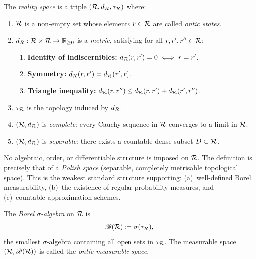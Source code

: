 \begin{definition}
\label{def:3.1}
The \emph{reality space} is a triple $(\mathcal{R}, d_{\mathcal{R}}, \tau_{\mathcal{R}})$ where:
\begin{enumerate}
  \item[(i)] $\mathcal{R}$ is a non-empty set whose elements $r \in \mathcal{R}$ are
    called \emph{ontic states}.
  \item[(ii)] $d_{\mathcal{R}} : \mathcal{R} \times \mathcal{R} \to \mathbb{R}_{\geq 0}$ is a
    \emph{metric}, satisfying for all $r, r', r'' \in \mathcal{R}$:
    \begin{enumerate}
      \item[(M1)] \textbf{Identity of indiscernibles:}
        $d_{\mathcal{R}}(r, r') = 0 \iff r = r'$.
      \item[(M2)] \textbf{Symmetry:} $d_{\mathcal{R}}(r, r') = d_{\mathcal{R}}(r', r)$.
      \item[(M3)] \textbf{Triangle inequality:}
        $d_{\mathcal{R}}(r, r'') \leq d_{\mathcal{R}}(r, r') + d_{\mathcal{R}}(r', r'')$.
    \end{enumerate}
  \item[(iii)] $\tau_{\mathcal{R}}$ is the topology induced by $d_{\mathcal{R}}$.
  \item[(iv)] $(\mathcal{R}, d_{\mathcal{R}})$ is \emph{complete}: every Cauchy sequence
    in $\mathcal{R}$ converges to a limit in $\mathcal{R}$.
  \item[(v)] $(\mathcal{R}, d_{\mathcal{R}})$ is \emph{separable}: there exists a
    countable dense subset $D \subset \mathcal{R}$.
\end{enumerate}
\end{definition}

\begin{remark}
\label{rem:3.1}
No algebraic, order, or differentiable structure is imposed on $\mathcal{R}$.
The definition is precisely that of a \emph{Polish space} (separable,
completely metrisable topological space).  This is the weakest standard
structure supporting:
(a)~well-defined Borel measurability,
(b)~the existence of regular probability measures, and
(c)~countable approximation schemes.
\end{remark}

\begin{definition}
\label{def:3.2}
The \emph{Borel $\sigma$-algebra} on $\mathcal{R}$ is
\[
  \mathscr{B}(\mathcal{R}) := \sigma(\tau_{\mathcal{R}}),
\]
the smallest $\sigma$-algebra containing all open sets in $\tau_{\mathcal{R}}$.
The measurable space $(\mathcal{R}, \mathscr{B}(\mathcal{R}))$ is called the
\emph{ontic measurable space}.
\end{definition}

